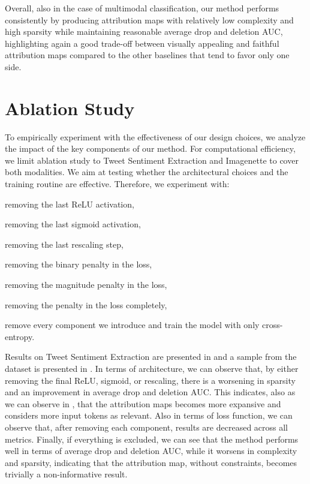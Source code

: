 Overall, also in the case of multimodal classification, our method performs consistently by producing attribution maps with relatively low complexity and high sparsity while maintaining reasonable average drop and deletion AUC, highlighting again a good trade-off between visually appealing and faithful attribution maps compared to the other baselines that tend to favor only one side.



\section{Ablation Study}

To empirically experiment with the effectiveness of our design choices, we analyze the impact of the key components of our method. For computational efficiency, we limit ablation study to Tweet Sentiment Extraction and Imagenette to cover both modalities. We aim at testing whether the architectural choices and the training routine are effective. Therefore, we experiment with:
\begin{enumerate*}
    \item removing the last ReLU activation,
    \item removing the last sigmoid activation,
    \item removing the last rescaling step,
    \item removing the binary penalty in the loss,
    \item removing the magnitude penalty in the loss,
    \item removing the penalty in the loss completely,
    \item remove every component we introduce and train the model with only cross-entropy.
\end{enumerate*}

Results on Tweet Sentiment Extraction are presented in  and a sample from the dataset is presented in . In terms of architecture, we can observe that, by either removing the final ReLU, sigmoid, or rescaling, there is a worsening in sparsity and an improvement in average drop and deletion AUC. This indicates, also as we can observe in , that the attribution maps becomes more expansive and considers more input tokens as relevant. Also in terms of loss function, we can observe that, after removing each component, results are decreased across all metrics. Finally, if everything is excluded, we can see that the method performs well in terms of average drop and deletion AUC, while it worsens in complexity and sparsity, indicating that the attribution map, without constraints, becomes trivially a non-informative result.


